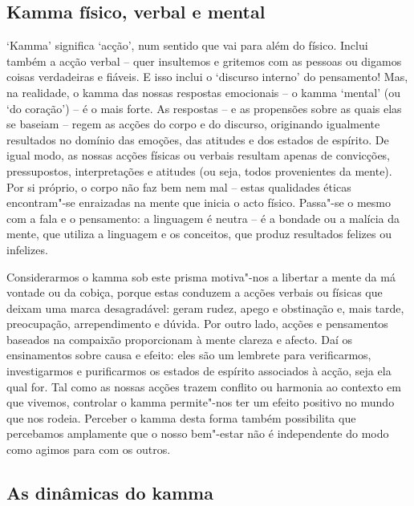 \subsection{Kamma físico, verbal e mental}

`Kamma' significa `acção', num sentido que vai para além do físico. Inclui
também a acção verbal -- quer insultemos e gritemos com as pessoas ou digamos
coisas verdadeiras e fiáveis. E isso inclui o `discurso interno' do pensamento!
Mas, na realidade, o kamma das nossas respostas emocionais -- o kamma `mental'
(ou `do coração') -- é o mais forte. As respostas -- e as propensões sobre as
quais elas se baseiam -- regem as acções do corpo e do discurso, originando
igualmente resultados no domínio das emoções, das atitudes e dos estados de
espírito. De igual modo, as nossas acções físicas ou verbais resultam apenas de
convicções, pressupostos, interpretações e atitudes (ou seja, todos provenientes
da mente). Por si próprio, o corpo não faz bem nem mal -- estas qualidades
éticas encontram"-se enraizadas na mente que inicia o acto físico. Passa"-se o
mesmo com a fala e o pensamento: a linguagem é neutra -- é a bondade ou a
malícia da mente, que utiliza a linguagem e os conceitos, que produz resultados
felizes ou infelizes.

Considerarmos o kamma sob este prisma motiva"-nos a libertar a mente da má
vontade ou da cobiça, porque estas conduzem a acções verbais ou físicas que
deixam uma marca desagradável: geram rudez, apego e obstinação e, mais tarde,
preocupação, arrependimento e dúvida. Por outro lado, acções e pensamentos
baseados na compaixão proporcionam à mente clareza e afecto. Daí os ensinamentos
sobre causa e efeito: eles são um lembrete para verificarmos, investigarmos e
purificarmos os estados de espírito associados à acção, seja ela qual for. Tal
como as nossas acções trazem conflito ou harmonia ao contexto em que vivemos,
controlar o kamma permite"-nos ter um efeito positivo no mundo que nos rodeia.
Perceber o kamma desta forma também possibilita que percebamos amplamente que o
nosso bem"-estar não é independente do modo como agimos para com os outros.

\subsection{As dinâmicas do kamma}

